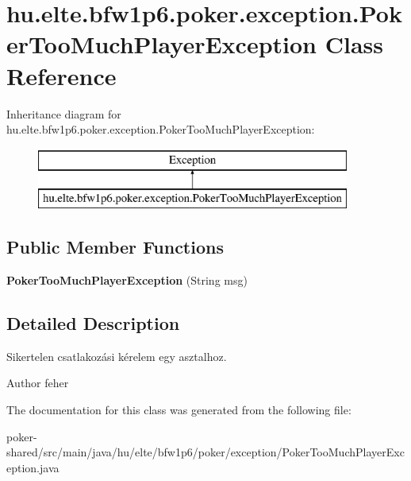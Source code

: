 \hypertarget{classhu_1_1elte_1_1bfw1p6_1_1poker_1_1exception_1_1_poker_too_much_player_exception}{}\section{hu.\+elte.\+bfw1p6.\+poker.\+exception.\+Poker\+Too\+Much\+Player\+Exception Class Reference}
\label{classhu_1_1elte_1_1bfw1p6_1_1poker_1_1exception_1_1_poker_too_much_player_exception}
Inheritance diagram for hu.\+elte.\+bfw1p6.\+poker.\+exception.\+Poker\+Too\+Much\+Player\+Exception\+:\begin{figure}[H]
\begin{center}
\leavevmode
\includegraphics[height=2.000000cm]{classhu_1_1elte_1_1bfw1p6_1_1poker_1_1exception_1_1_poker_too_much_player_exception}
\end{center}
\end{figure}
\subsection*{Public Member Functions}
\begin{DoxyCompactItemize}
\item 
\hypertarget{classhu_1_1elte_1_1bfw1p6_1_1poker_1_1exception_1_1_poker_too_much_player_exception_a773ead33d6bbb74a7f44e2e44296981a}{}{\bfseries Poker\+Too\+Much\+Player\+Exception} (String msg)\label{classhu_1_1elte_1_1bfw1p6_1_1poker_1_1exception_1_1_poker_too_much_player_exception_a773ead33d6bbb74a7f44e2e44296981a}

\end{DoxyCompactItemize}


\subsection{Detailed Description}
Sikertelen csatlakozási kérelem egy asztalhoz. \begin{DoxyAuthor}{Author}
feher 
\end{DoxyAuthor}


The documentation for this class was generated from the following file\+:\begin{DoxyCompactItemize}
\item 
poker-\/shared/src/main/java/hu/elte/bfw1p6/poker/exception/Poker\+Too\+Much\+Player\+Exception.\+java\end{DoxyCompactItemize}
